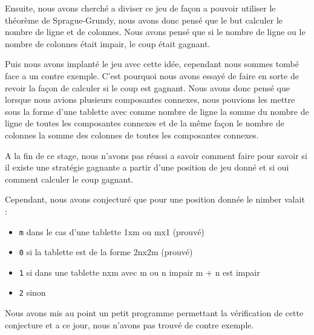 Ensuite, nous avons cherché a diviser ce jeu de façon a pouvoir utiliser le théorème de Sprague-Grundy, nous avons donc pensé que le but calculer le nombre de ligne et de colonnes. Nous avons pensé que si le nombre de ligne ou le nombre de colonnes était impair, le coup était gagnant.

Puis nous avons implanté le jeu avec cette idée, cependant nous sommes tombé face a un contre exemple. C'est pourquoi nous avons essayé de faire en sorte de revoir la façon de calculer si le coup est gagnant. Nous avons donc pensé que lorsque nous avions plusieurs composantes connexes, nous pouvions les mettre sous la forme d'une tablette avec comme nombre de ligne la somme du nombre de ligne de toutes les composantes connexes et de la même façon le nombre de colonnes la somme des colonnes de toutes les composantes connexes.

A la fin de ce stage, nous n'avons pas réussi a savoir comment faire pour savoir si il existe une stratégie gagnante a partir d'une position de jeu donné et si oui comment calculer le coup gagnant.

Cependant, nous avons conjecturé que pour une position donnée le nimber valait :
\begin{itemize}
  \item \texttt{m} dans le cas d'une tablette 1xm ou mx1 (prouvé)
  \item \texttt{0} si la tablette est de la forme 2nx2m (prouvé)
  \item \texttt{1} si dans une tablette nxm avec m ou n impair m + n est impair
  \item \texttt{2} sinon
\end{itemize}
  Nous avons mis au point un petit programme permettant la vérification de cette conjecture et a ce jour, nous n'avons pas trouvé de contre exemple.